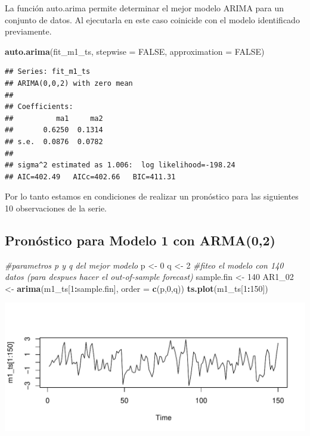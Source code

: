 \documentclass[
  11pt,
]{article}
\newenvironment{Shaded}{\begin{snugshade}}{\end{snugshade}}
\newcommand{\CommentTok}[1]{\textcolor[rgb]{0.56,0.35,0.01}{\textit{#1}}}
\newcommand{\DataTypeTok}[1]{\textcolor[rgb]{0.13,0.29,0.53}{#1}}
\newcommand{\DecValTok}[1]{\textcolor[rgb]{0.00,0.00,0.81}{#1}}
\newcommand{\KeywordTok}[1]{\textcolor[rgb]{0.13,0.29,0.53}{\textbf{#1}}}
\newcommand{\NormalTok}[1]{#1}
\newcommand{\OperatorTok}[1]{\textcolor[rgb]{0.81,0.36,0.00}{\textbf{#1}}}
\newcommand{\OtherTok}[1]{\textcolor[rgb]{0.56,0.35,0.01}{#1}}
\newcommand{\StringTok}[1]{\textcolor[rgb]{0.31,0.60,0.02}{#1}}
\begin{document}
La función auto.arima permite determinar el mejor modelo ARIMA para un
conjunto de datos. Al ejecutarla en este caso coinicide con el modelo
identificado previamente.

\begin{Shaded}
\begin{Highlighting}[]
  \KeywordTok{auto.arima}\NormalTok{(fit_m1_ts, }\DataTypeTok{stepwise =} \OtherTok{FALSE}\NormalTok{, }\DataTypeTok{approximation =} \OtherTok{FALSE}\NormalTok{)}
\end{Highlighting}
\end{Shaded}

\begin{verbatim}
## Series: fit_m1_ts 
## ARIMA(0,0,2) with zero mean 
## 
## Coefficients:
##          ma1     ma2
##       0.6250  0.1314
## s.e.  0.0876  0.0782
## 
## sigma^2 estimated as 1.006:  log likelihood=-198.24
## AIC=402.49   AICc=402.66   BIC=411.31
\end{verbatim}

Por lo tanto estamos en condiciones de realizar un pronóstico para las
siguientes 10 observaciones de la serie.

\hypertarget{pronuxf3stico-para-modelo-1-con-arma02}{%
\subsection{Pronóstico para Modelo 1 con
ARMA(0,2)}\label{pronuxf3stico-para-modelo-1-con-arma02}}

\begin{Shaded}
\begin{Highlighting}[]
\CommentTok{#parametros p y q del mejor modelo}
\NormalTok{p <-}\StringTok{ }\DecValTok{0}
\NormalTok{q <-}\StringTok{ }\DecValTok{2}
\CommentTok{#fiteo el modelo con 140 datos (para despues hacer el out-of-sample forecast)}
\NormalTok{sample.fin <-}\StringTok{ }\DecValTok{140}
\NormalTok{AR1_}\DecValTok{02}\NormalTok{ <-}\StringTok{ }\KeywordTok{arima}\NormalTok{(m1_ts[}\DecValTok{1}\OperatorTok{:}\NormalTok{sample.fin], }\DataTypeTok{order =} \KeywordTok{c}\NormalTok{(p,}\DecValTok{0}\NormalTok{,q))}
\KeywordTok{ts.plot}\NormalTok{(m1_ts[}\DecValTok{1}\OperatorTok{:}\DecValTok{150}\NormalTok{])}
\end{Highlighting}
\end{Shaded}

\begin{center}\includegraphics[width=0.9\linewidth]{RmdFigs/fit_1_m1-1} \end{center}
\end{document}
